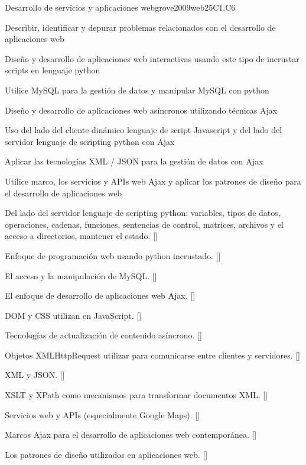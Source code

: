 \begin{syllabus}
\begin{unit}{Desarrollo de servicios y aplicaciones web}{}{grove2009web}{25}{C1,C6}
   \begin{topics}
    \item Describir, identificar y depurar problemas relacionados con el desarrollo de aplicaciones web
    \item Diseño y desarrollo de aplicaciones web interactivas usando este tipo de incrustar scripts en lenguaje python
    \item Utilice MySQL para la gestión de datos y manipular MySQL con python
    \item Diseño y desarrollo de aplicaciones web asíncronos utilizando técnicas Ajax
    \item Uso del lado del cliente dinámico lenguaje de script Javascript y del lado del servidor lenguaje de scripting python con Ajax
    \item Aplicar las tecnologías XML / JSON para la gestión de datos con Ajax
    \item Utilice marco, los servicios y APIs web Ajax y aplicar los patrones de diseño para el desarrollo de aplicaciones web
   \end{topics}
   \begin{learningoutcomes}
      \item Del lado del servidor lenguaje de scripting python: variables, tipos de datos, operaciones, cadenas, 
            funciones, sentencias de control, matrices, archivos y el acceso a directorios, mantener el estado. [\Usage]
      \item Enfoque de programación web usando python incrustado. [\Usage]
      \item El acceso y la manipulación de MySQL. [\Usage]
      \item El enfoque de desarrollo de aplicaciones web Ajax. [\Usage]
      \item DOM y CSS utilizan en JavaScript. [\Usage]
      \item Tecnologías de actualización de contenido asíncrono. [\Usage]
      \item Objetos XMLHttpRequest utilizar para comunicarse entre clientes y servidores. [\Usage]
      \item XML y JSON. [\Usage]
      \item XSLT y XPath como mecanismos para transformar documentos XML. [\Usage]
      \item Servicios web y APIs (especialmente Google Maps). [\Usage]
      \item Marcos Ajax para el desarrollo de aplicaciones web contemporánea. [\Usage]
      \item Los patrones de diseño utilizados en aplicaciones web. [\Usage]
   \end{learningoutcomes}
\end{unit}


\end{syllabus}

